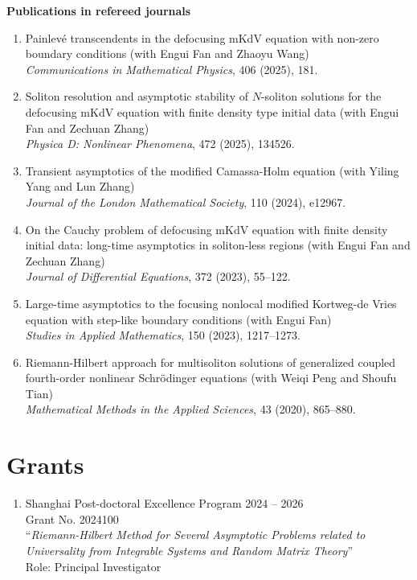 \documentclass[margin]{res}
\begin{document}
\begin{resume}
\textbf{Publications in refereed journals}
\begin{enumerate}[1.]
    \item Painlev\'{e} transcendents in the defocusing mKdV equation with non-zero boundary conditions (with Engui Fan and Zhaoyu Wang)\\
    {\sl Communications in Mathematical Physics}, 406 (2025), 181.

    \item Soliton resolution and asymptotic stability of $N$-soliton solutions for the defocusing mKdV equation with finite density type initial data (with Engui Fan and Zechuan Zhang)\\ 
    {\sl Physica D: Nonlinear Phenomena}, 472 (2025), 134526. 

    \item Transient asymptotics of the modified Camassa-Holm equation (with Yiling Yang and Lun Zhang) \\
    {\sl Journal of the London Mathematical Society}, 110 (2024), e12967. 

    \item On the Cauchy problem of defocusing mKdV equation with finite density initial data: long-time asymptotics in soliton-less regions (with Engui Fan and Zechuan Zhang)\\
    {\sl Journal of Differential Equations}, 372 (2023), 55--122.

    \item Large-time asymptotics to the focusing nonlocal modified Kortweg-de Vries equation with step-like boundary conditions (with Engui Fan)\\
    {\sl Studies in Applied Mathematics}, 150 (2023), 1217--1273. 
    
    \item Riemann-Hilbert approach for multisoliton solutions of generalized coupled fourth-order nonlinear Schr\"odinger equations
    (with Weiqi Peng and Shoufu Tian)\\
    {\sl Mathematical Methods in the Applied Sciences}, 43 (2020), 865--880.
\end{enumerate}

\section{Grants}
\begin{enumerate}[--]
\item Shanghai Post-doctoral Excellence Program \hfill 2024 -- 2026  \\
Grant No. 2024100\\
``{\sl Riemann-Hilbert Method for Several Asymptotic Problems related to Universality from Integrable Systems and Random Matrix Theory}''  \\
Role: Principal Investigator


\end{enumerate}
\end{resume}
\end{document}
